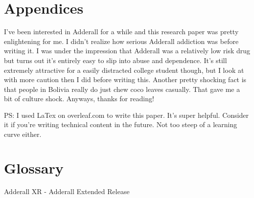 \documentclass{article}
\begin{document}
        
   
    \pagebreak
    \section{Appendices}
        I've been interested in Adderall for a while and this research paper was pretty enlightening for me. I didn't realize how serious Adderall addiction was before writing it. I was under the impression that Adderall was a relatively low risk drug but turns out it's entirely easy to slip into abuse and dependence. It's still extremely attractive for a easily distracted college student though, but I look at with more caution then I did before writing this. Another pretty shocking fact is that people in Bolivia really do just chew coco leaves casually. That gave me a bit of culture shock. Anyways, thanks for reading!
        
        PS: I used LaTex on overleaf.com to write this paper. It's super helpful. Consider it if you're writing technical content in the future. Not too steep of a learning curve either.
    \section{Glossary}
        Adderall XR - Adderall Extended Release
    
\end{document}
